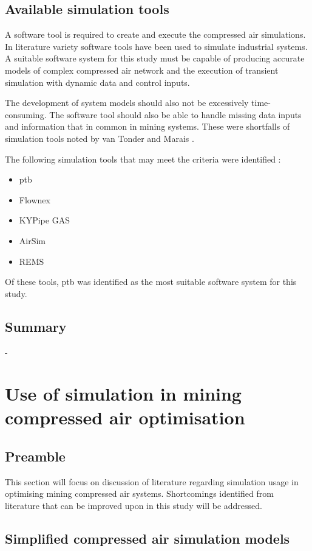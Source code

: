  	\subsection{Available simulation tools}
 	A software tool is required to create and execute the compressed air simulations. In literature variety software tools have been used to simulate industrial systems. A suitable software system for this study must be capable of producing accurate models of complex compressed air network and the execution of transient simulation with dynamic data and control inputs. 
 	\par 
 	The development of system models should also not be excessively time-consuming. The software tool should also be able to handle missing data inputs and information that in common in mining systems.  These were shortfalls of simulation tools noted by van Tonder \cite{vanTonder2014PhD} and Marais \cite{Mare2016PhD}.
	\par
 	  The following simulation tools that may meet the criteria were identified : 
 	\begin{itemize}
 		\item \gls{ptb}
 		\item Flownex
		\item KYPipe GAS
		\item AirSim
		\item REMS
 	\end{itemize}
 Of these tools, \gls{ptb} was identified as the most suitable software system for this study. %
 	\subsection{Summary}-
\section{Use of simulation in mining compressed air optimisation}
\subsection{Preamble}
This section will focus on discussion of literature regarding simulation usage in optimising mining compressed air systems. Shortcomings identified from literature that can be improved upon in this study will be addressed.
\subsection{Simplified compressed air simulation models} \label{simplfiedModels}
